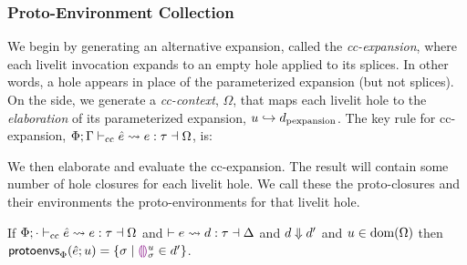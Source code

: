 \subsubsection{Proto-Environment Collection}
We begin by generating an alternative expansion,
called the \emph{cc-expansion},
where each livelit invocation expands to an empty hole applied to its splices. In other words,
a hole appears in place of the parameterized expansion (but not splices). On the side, we generate a \emph{cc-context}, $\Omega$,  that maps each livelit hole to the \emph{elaboration} of its parameterized expansion, $\Omegaitem{u}{\dtxt{pexpansion}}$.
The key rule for cc-expansion, $\ccexpands{\Phi}{\Gamma}{\hat e}{e}{\tau}{\Omega}$, is:
\begin{mathpar}
\end{mathpar}

We then elaborate and evaluate the cc-expansion. 
The result will contain some number of hole closures
for each livelit hole. We call these the proto-closures and their environments the proto-environments for that livelit hole.
\begin{definition}
If $\ccexpands{\Phi}{\cdot}{\hat e}{e}{\tau}{\Omega}$ and $\elabs{}{e}{d}{\tau}{\Delta}$
and $\evalsTo{d}{d'}$ and $u \in \domof{\Omega}$ then $\protoEnvsOf{\Phi}{\hat e}{u} = \{ \sigma \mid \dehole{u}{\sigma} \in d' \}$.
\end{definition}

